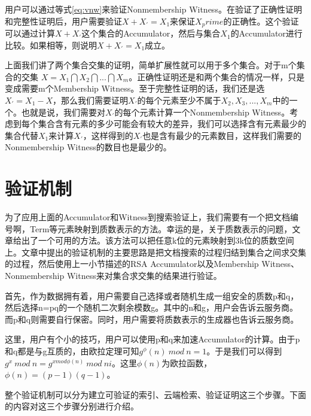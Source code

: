 用户可以通过等式\ref{eq:vnw}来验证Nonmembership Witness。在验证了正确性证明和完整性证明后，用户需要验证$X + X_\prime = X_1$来保证$X_prime$的正确性。这个验证可以通过计算$X + X_\prime$这个集合的Accumulator，然后与集合$X_1$的Accumulator进行比较。如果相等，则说明$X + X_\prime = X_1$成立。

上面我们讲了两个集合交集的证明，简单扩展性就可以用于多个集合。对于m个集合的交集 $X = X_1 \bigcap X_2 \bigcap ... \bigcap X_m$。正确性证明还是和两个集合的情况一样，只是变成需要m个Membership Witness。至于完整性证明的话，我们还是选$X_\prime = X_1 - X$，那么我们需要证明$X_\prime$的每个元素至少不属于$X_2, X_3,...,X_m$中的一个。也就是说，我们需要对$X_\prime$的每个元素计算一个Nonmembership Witness。考虑到每个集合含有元素的多少可能会有较大的差异，我们可以选择含有元素最少的集合代替$X_1$来计算$X_\prime$，这样得到的$X_\prime$也是含有最少的元素数目，这样我们需要的Nonmembership Witness的数目也是最少的。

\section{验证机制}
为了应用上面的Accumulator和Witness到搜索验证上，我们需要有一个把文档编号啊，Term等元素映射到质数表示的方法。幸运的是，关于质数表示的问题，文章\cite{gennaro1999secure,goodrich2002efficient}给出了一个可用的方法。该方法可以把任意k位的元素映射到3k位的质数空间上。文章\cite{verifiableindex}中提出的验证机制的主要思路是把文档搜索的过程归结到集合之间求交集的过程，然后使用上一小节描述的RSA Accumulator以及Membership Witness、Nonmembership Witness来对集合求交集的结果进行验证。

首先，作为数据拥有着，用户需要自己选择或者随机生成一组安全的质数p和q，然后选择n=pq的一个随机二次剩余模数g。其中的n和g，用户会告诉云服务商。而p和q则需要自行保密。同时，用户需要将质数表示的生成器也告诉云服务商。

这里，用户有个小的技巧，用户可以使用p和q来加速Accumulator的计算。由于p和q都是与g互质的，由欧拉定理可知$g^\phi(n)\ mod\ n = 1$。于是我们可以得到$g^x\ mod\ n  = g^{x mod \phi(n)}\ mod\ ni$。这里$\phi(n)$为欧拉函数，$\phi(n) = (p-1)(q-1)$。

整个验证机制可以分为建立可验证的索引、云端检索、验证证明这三个步骤。下面的内容对这三个步骤分别进行介绍。

